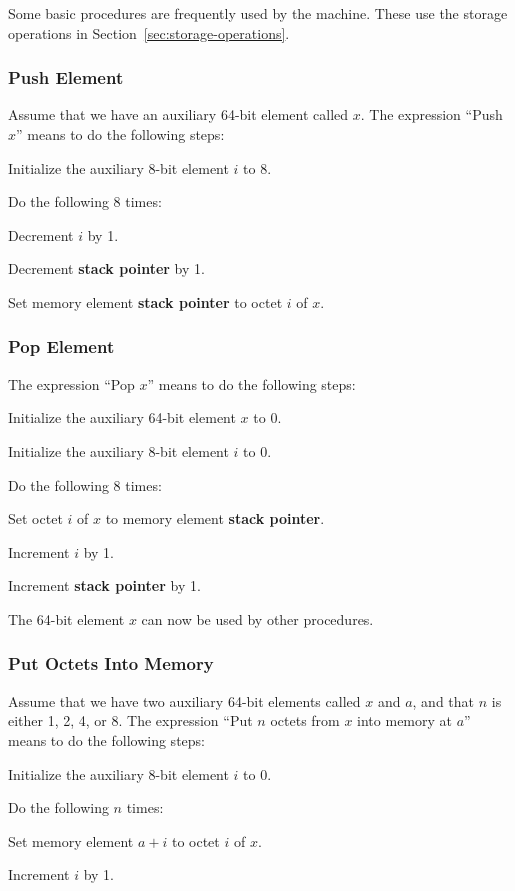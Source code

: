 \documentclass[a4paper,12pt]{article}
\newcommand{\SP}{\textbf{stack pointer}\xspace}
\begin{document}
Some basic procedures are frequently used by the machine.
These use the storage operations in Section~\ref{sec:storage-operations}.

\subsubsection{Push Element}

Assume that we have an auxiliary 64-bit element called $x$.
The expression ``Push $x$'' means to do the following steps:
\begin{stepnumbers}
\item Initialize the auxiliary 8-bit element $i$ to 8.
\item Do the following 8 times:
  \begin{stepletters}
  \item Decrement $i$ by 1.
  \item Decrement \SP by 1.
  \item Set memory element \SP to octet $i$ of $x$.
  \end{stepletters}
\end{stepnumbers}

\subsubsection{Pop Element}

The expression ``Pop $x$'' means to do the following steps:
\begin{stepnumbers}
\item Initialize the auxiliary 64-bit element $x$ to 0.
\item Initialize the auxiliary 8-bit element $i$ to 0.
\item Do the following 8 times:
  \begin{stepletters}
  \item Set octet $i$ of $x$ to memory element \SP.
  \item Increment $i$ by 1.
  \item Increment \SP by 1.
  \end{stepletters}
\end{stepnumbers}
The 64-bit element $x$ can now be used by other procedures.

\subsubsection{Put Octets Into Memory}

Assume that we have two auxiliary 64-bit elements called $x$ and $a$, and that $n$ is either 1, 2, 4, or 8.
The expression ``Put $n$ octets from $x$ into memory at $a$'' means to do the following steps:
\begin{stepnumbers}
\item Initialize the auxiliary 8-bit element $i$ to 0.
\item Do the following $n$ times:
  \begin{stepletters}
  \item Set memory element $a+i$ to octet $i$ of $x$.
  \item Increment $i$ by 1.
  \end{stepletters}
\end{stepnumbers}
\end{document}
